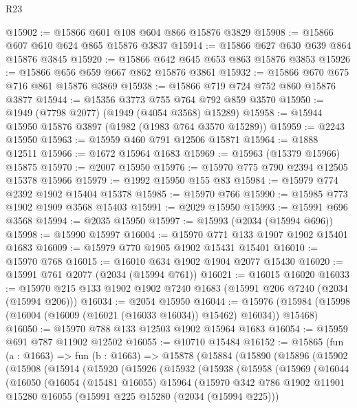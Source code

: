 \begin{lexlean}{R23}
\begin{coremodule}
@15902 := @15866 @601 @108 @604 @866 @15876 @3829
@15908 := @15866 @607 @610 @624 @865 @15876 @3837
@15914 := @15866 @627 @630 @639 @864 @15876 @3845
@15920 := @15866 @642 @645 @653 @863 @15876 @3853
@15926 := @15866 @656 @659 @667 @862 @15876 @3861
@15932 := @15866 @670 @675 @716 @861 @15876 @3869
@15938 := @15866 @719 @724 @752 @860 @15876 @3877
@15944 := @15356 @3773 @755 @764 @792 @859 @3570
@15950 := @1949 (@7798 @2077) (@1949 (@4054 @3568) @15289)
@15958 := @15944 @15950 @15876 @3897 (@1982 (@1983 @764 @3570 @15289))
@15959 := @2243 @15950
@15963 := @15959 @460 @791 @12506 @15871
@15964 := @1888 @12511
@15966 := @1672 @15964 @1683
@15969 := @15963 (@15379 @15966) @15875
@15970 := @2007 @15950
@15976 := @15970 @775 @790 @2394 @12505 @15378 @15966
@15979 := @1992 @15950 @155 @83
@15984 := @15979 @774 @2392 @1902 @15404 @15378
@15985 := @15970 @766
@15990 := @15985 @773 @1902 @1909 @3568 @15403
@15991 := @2029 @15950
@15993 := @15991 @696 @3568
@15994 := @2035 @15950
@15997 := @15993 (@2034 (@15994 @696))
@15998 := @15990 @15997
@16004 := @15970 @771 @133 @1907 @1902 @15401 @1683
@16009 := @15979 @770 @1905 @1902 @15431 @15401
@16010 := @15970 @768
@16015 := @16010 @634 @1902 @1904 @2077 @15430
@16020 := @15991 @761 @2077 (@2034 (@15994 @761))
@16021 := @16015 @16020
@16033 := @15970 @215 @133 @1902 @1902 @7240 @1683 (@15991 @206 @7240 (@2034 (@15994 @206)))
@16034 := @2054 @15950
@16044 := @15976 (@15984 (@15998 (@16004 (@16009 (@16021 (@16033 @16034)) @15462) @16034)) @15468)
@16050 := @15970 @788 @133 @12503 @1902 @15964 @1683
@16054 := @15959 @691 @787 @11902 @12502
@16055 := @10710 @15484
@16152 := @15865
    (fun (a : @1663) =>
    fun (b : @1663) =>
    @15878
      (@15884
        (@15890
          (@15896
            (@15902
              (@15908
                (@15914
                  (@15920
                    (@15926
                      (@15932
                        (@15938
                          (@15958
                            (@15969
                              (@16044
                                (@16050
                                  (@16054
                                    (@15481 @16055)
                                    @15964
                                    (@15970
                                      @342
                                      @786
                                      @1902
                                      @11901
                                      @15280
                                      @16055
                                      (@15991 @225 @15280 (@2034 (@15994 @225)))

\end{coremodule}
\end{lexlean}
